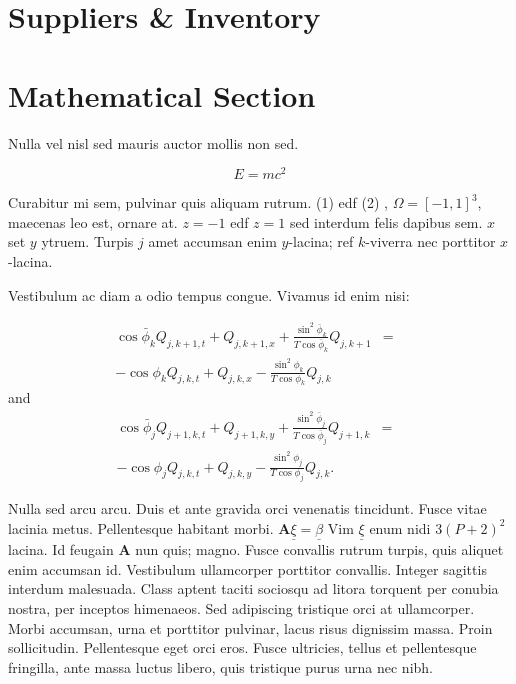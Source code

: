 \documentclass[a0,landscape]{a0poster}
\begin{document}
\begin{multicols}{4}
\color{DarkSlateGrey}
\section*{Suppliers \& Inventory}


\section*{Mathematical Section}

Nulla vel nisl sed mauris auctor mollis non sed. 

\begin{equation}
E = mc^{2}
\label{eqn:Einstein}
\end{equation}

Curabitur mi sem, pulvinar quis aliquam rutrum. (1) edf (2)
, $\Omega=[-1,1]^3$, maecenas leo est, ornare at. $z=-1$ edf $z=1$ sed interdum felis dapibus sem. $x$ set $y$ ytruem. 
Turpis $j$ amet accumsan enim $y$-lacina; 
ref $k$-viverra nec porttitor $x$-lacina. 

Vestibulum ac diam a odio tempus congue. Vivamus id enim nisi:

\begin{eqnarray}
\cos\bar{\phi}_k Q_{j,k+1,t} + Q_{j,k+1,x}+\frac{\sin^2\bar{\phi}_k}{T\cos\bar{\phi}_k} Q_{j,k+1} &=&\nonumber\\ 
-\cos\phi_k Q_{j,k,t} + Q_{j,k,x}-\frac{\sin^2\phi_k}{T\cos\phi_k} Q_{j,k}\label{edgek}
\end{eqnarray}
and
\begin{eqnarray}
\cos\bar{\phi}_j Q_{j+1,k,t} + Q_{j+1,k,y}+\frac{\sin^2\bar{\phi}_j}{T\cos\bar{\phi}_j} Q_{j+1,k}&=&\nonumber \\
-\cos\phi_j Q_{j,k,t} + Q_{j,k,y}-\frac{\sin^2\phi_j}{T\cos\phi_j} Q_{j,k}.\label{edgej}
\end{eqnarray} 

Nulla sed arcu arcu. Duis et ante gravida orci venenatis tincidunt. Fusce vitae lacinia metus. Pellentesque habitant morbi. $\mathbf{A}\underline{\xi}=\underline{\beta}$ Vim $\underline{\xi}$ enum nidi $3(P+2)^{2}$ lacina. Id feugain $\mathbf{A}$ nun quis; magno. Fusce convallis rutrum turpis, quis aliquet enim accumsan id. Vestibulum ullamcorper porttitor convallis. Integer sagittis interdum malesuada. Class aptent taciti sociosqu ad litora torquent per conubia nostra, per inceptos himenaeos. Sed adipiscing tristique orci at ullamcorper. Morbi accumsan, urna et porttitor pulvinar, lacus risus dignissim massa. Proin sollicitudin. Pellentesque eget orci eros. Fusce ultricies, tellus et pellentesque fringilla, ante massa luctus libero, quis tristique purus urna nec nibh.


\end{multicols}
\end{document}
